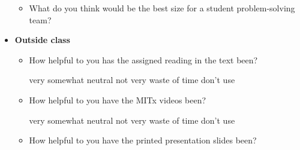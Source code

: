 \documentclass[handout]{mcs}
\begin{document}
\begin{itemize}
\begin{itemize}
\iffalse
\item Name one person on your team who in the last few weeks has
  \begin{itemize}
    \item become more helpful to you personally \hfill\examrule[2in]
    \item seemed to be better prepared for class\hfill\examrule[2in]
    \item given better explanations to others\hfill\examrule[2in]
    \item improved at board writing\hfill\examrule[2in]
    \item improved at catching mistakes in board solutions\hfill\examrule[2in]
  \end{itemize}
\fi


\item What do you think would be the best size for a student
  problem-solving team? \brule{0.5in}


\end{itemize}

\item \textbf{Outside class}

\begin{itemize}

\item How helpful to you has the assigned reading in the text been?

\begin{center}
very\hspace{0.3in} somewhat \hspace{0.3in} neutral\hspace{0.3in} not
very \hspace{0.3in} waste of time  \hspace{0.7in}don't use
\end{center}

\item How helpful to you have the MITx videos been?

\begin{center}
very\hspace{0.3in} somewhat \hspace{0.3in} neutral\hspace{0.3in} not
very \hspace{0.3in} waste of time  \hspace{0.7in}don't use
\end{center}

\item How helpful to you have the printed presentation slides been?


\end{itemize}
\end{itemize}
\end{document}
